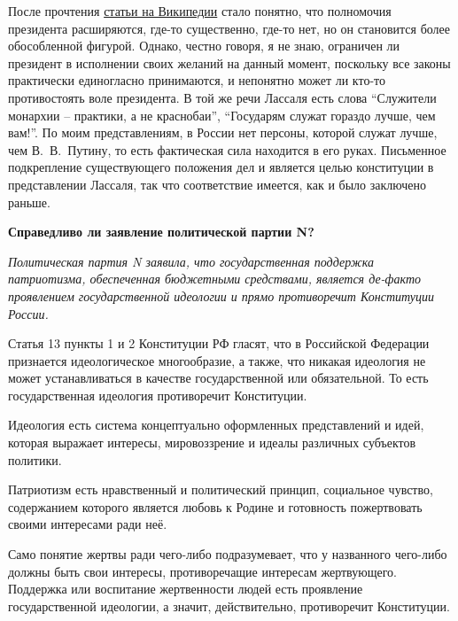 \documentclass[a4paper, 12pt]{article}
\begin{document}
После прочтения 
\href{https://ru.wikipedia.org/wiki/%D0%9F%D0%BE%D0%BF%D1%80%D0%B0%D0%B2%D0%BA%D0%B8_%D0%BA_%D0%9A%D0%BE%D0%BD%D1%81%D1%82%D0%B8%D1%82%D1%83%D1%86%D0%B8%D0%B8_%D0%A0%D0%BE%D1%81%D1%81%D0%B8%D0%B8_(2020)}{статьи на Википедии}
стало понятно, что полномочия президента расширяются, где-то существенно, где-то нет, но он становится более обособленной фигурой. Однако, честно говоря, я не знаю, ограничен ли президент в исполнении своих желаний на данный момент, поскольку все законы практически единогласно принимаются, и непонятно может ли кто-то противостоять воле президента. В той же речи Лассаля есть слова ``Служители монархии – практики, а не краснобаи'', ``Государям служат гораздо лучше, чем вам!''. По моим представлениям, в России нет персоны, которой служат лучше, чем В.~В.~Путину, то есть фактическая сила находится в его руках. Письменное подкрепление существующего положения дел и является целью конституции в представлении Лассаля, так что соответствие имеется, как и было заключено раньше. 



\newpage
\begin{center}
\bf Справедливо ли заявление политической партии N?
\end{center}

\textit{Политическая партия N заявила, что государственная поддержка патриотизма, обеспеченная бюджетными средствами, является де-факто проявлением государственной идеологии и прямо противоречит Конституции России.}

Статья 13 пункты 1 и 2 Конституции РФ гласят, что в Российской Федерации признается идеологическое многообразие, а также, что никакая идеология не может устанавливаться в качестве государственной или обязательной. То есть государственная идеология противоречит Конституции. 

Идеология есть система концептуально оформленных представлений и идей, которая выражает интересы, мировоззрение и идеалы различных субъектов политики. 

Патриотизм есть нравственный и политический принцип, социальное чувство, содержанием которого является любовь к Родине и готовность пожертвовать своими интересами ради неё. 

Само понятие жертвы ради чего-либо подразумевает, что у названного чего-либо должны быть свои интересы, противоречащие интересам жертвующего. Поддержка или воспитание жертвенности людей есть проявление государственной идеологии, а значит, действительно, противоречит Конституции. 
\end{document}
